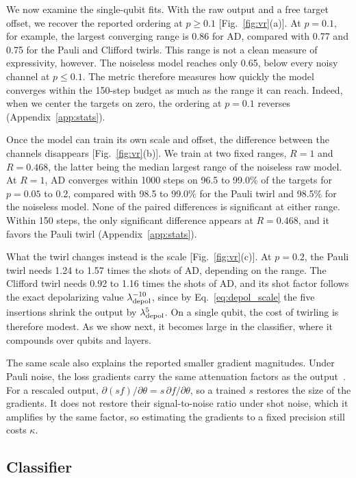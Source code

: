 \documentclass[
 aps,pra,
 twocolumn,
 superscriptaddress,
 longbibliography,
 nofootinbib
]{revtex4-2}
\begin{document}
We now examine the single-qubit fits. With
the raw output and a free target offset, we recover the reported ordering at
$p\ge0.1$ [Fig.~\ref{fig:vr}(a)]. At $p=0.1$, for example, the largest
converging range is 0.86 for AD, compared with 0.77 and 0.75 for the Pauli and
Clifford twirls. This range is not a clean measure of expressivity,
however. The noiseless model reaches only 0.65, below every noisy channel at
$p\le0.1$. The metric therefore measures how quickly the model converges within
the 150-step budget as much as the range it can reach. Indeed, when we center
the targets on zero, the ordering at $p=0.1$ reverses (Appendix~\ref{app:stats}).

Once the model can train its own scale and offset, the difference between the
channels disappears [Fig.~\ref{fig:vr}(b)]. We train at two fixed ranges, $R=1$
and $R=0.468$, the latter being the median largest range of the noiseless raw
model. At $R=1$, AD converges within 1000 steps on 96.5 to 99.0\% of the
targets for $p=0.05$ to 0.2, compared with 98.5 to 99.0\% for the Pauli twirl
and 98.5\% for the noiseless model. None of the paired differences is
significant at either range. Within 150 steps, the only significant difference
appears at $R=0.468$, and it favors the Pauli twirl (Appendix~\ref{app:stats}).

What the twirl changes instead is the scale [Fig.~\ref{fig:vr}(c)]. At $p=0.2$,
the Pauli twirl needs 1.24 to 1.57 times the shots of AD, depending on the
range. The Clifford twirl needs 0.92 to 1.16 times the shots of AD, and its
shot factor follows the exact depolarizing value $\lambda_{\rm depol}^{-10}$,
since by Eq.~\eqref{eq:depol_scale} the five insertions shrink the output by
$\lambda_{\rm depol}^5$. On a single qubit, the cost of twirling is therefore
modest. As we show next, it becomes large in the classifier, where it compounds
over qubits and layers.

The same scale also explains the reported smaller gradient magnitudes. Under
Pauli noise, the loss gradients carry the same attenuation factors as the
output~\cite{vanrossum2026biased}. For a rescaled
output, $\partial(sf)/\partial\theta=s\,\partial f/\partial\theta$, so a trained
$s$ restores the size of the gradients. It does not restore their
signal-to-noise ratio under shot noise, which it amplifies by the same factor,
so estimating the gradients to a fixed precision still costs $\kappa$.

\subsection{Classifier}
\label{sec:clf}
\end{document}

